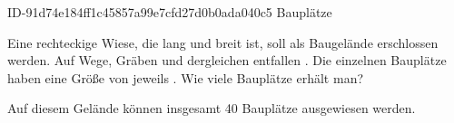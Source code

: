 \begin{exercise}
      {ID-91d74e184ff1c45857a99e7cfd27d0b0ada040c5}
      {Bauplätze}
  \ifproblem\problem\par
    Eine rechteckige Wiese, die  lang und  breit ist, soll
    als Baugelände erschlossen werden. Auf Wege, Gräben und dergleichen entfallen
    . Die einzelnen Bauplätze haben eine Größe von jeweils .
    Wie viele Bauplätze erhält man?
  \fi
  \ifoutcome\outcome\par
    Auf diesem Gelände können insgesamt \num{40} Bauplätze ausgewiesen werden.
  \fi
\end{exercise}
